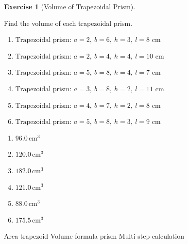\documentclass[
  letterpaper,
  DIV=11,
  numbers=noendperiod]{scrreprt}
\theoremstyle{definition}
\newtheorem{exercise}{Exercise}[chapter]
\theoremstyle{remark}
\begin{document}
\begin{exercise}[Volume of Trapezoidal
Prism]\protect\hypertarget{exr-vol-4}{}\label{exr-vol-4}

Find the volume of each trapezoidal prism.

\begin{enumerate}
\def\labelenumi{\alph{enumi})}
\item
  \(\text{Trapezoidal prism: }a=2,\ b=6,\ h=3,\ l=8\text{ cm}\)
\item
  \(\text{Trapezoidal prism: }a=2,\ b=4,\ h=4,\ l=10\text{ cm}\)
\item
  \(\text{Trapezoidal prism: }a=5,\ b=8,\ h=4,\ l=7\text{ cm}\)
\item
  \(\text{Trapezoidal prism: }a=3,\ b=8,\ h=2,\ l=11\text{ cm}\)
\item
  \(\text{Trapezoidal prism: }a=4,\ b=7,\ h=2,\ l=8\text{ cm}\)
\item
  \(\text{Trapezoidal prism: }a=5,\ b=8,\ h=3,\ l=9\text{ cm}\)
\end{enumerate}

\begin{tcolorbox}[enhanced jigsaw, opacitybacktitle=0.6, coltitle=black, arc=.35mm, colframe=quarto-callout-tip-color-frame, colback=white, bottomrule=.15mm, left=2mm, colbacktitle=quarto-callout-tip-color!10!white, titlerule=0mm, opacityback=0, title=\textcolor{quarto-callout-tip-color}{\faLightbulb}\hspace{0.5em}{🔍 View Solution}, leftrule=.75mm, breakable, rightrule=.15mm, bottomtitle=1mm, toptitle=1mm, toprule=.15mm]

\begin{enumerate}
\def\labelenumi{\alph{enumi})}
\item
  \(96.0\,\text{cm}^{3}\)
\item
  \(120.0\,\text{cm}^{3}\)
\item
  \(182.0\,\text{cm}^{3}\)
\item
  \(121.0\,\text{cm}^{3}\)
\item
  \(88.0\,\text{cm}^{3}\)
\item
  \(175.5\,\text{cm}^{3}\)
\end{enumerate}

\end{tcolorbox}

{Area trapezoid} {Volume formula prism} {Multi step calculation}

\end{exercise}
\end{document}
